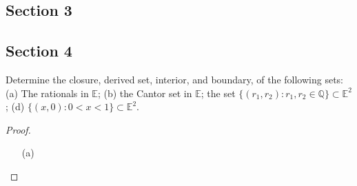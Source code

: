\documentclass[12pt]{article}
\newcommand{\Q}{\mathbb{Q}}
\newcommand{\E}{\mathbb{E}}
\begin{document}
\subsection*{Section 3}


\subsection*{Section 4}
\begin{problem}{1} Determine the closure, derived set, interior, and boundary, of the following sets: (a) The rationals in $\E$; (b) the Cantor set in $\E$; the set $\{(r_1, r_2): r_1, r_2 \in \Q \} \subset \E^2$; (d) $\{(x, 0): 0 < x < 1 \} \subset \E^2$.
\end{problem}
\begin{proof}
    \begin{itemize}
        \item[(a)]  
    \end{itemize}
\end{proof}
\end{document}
